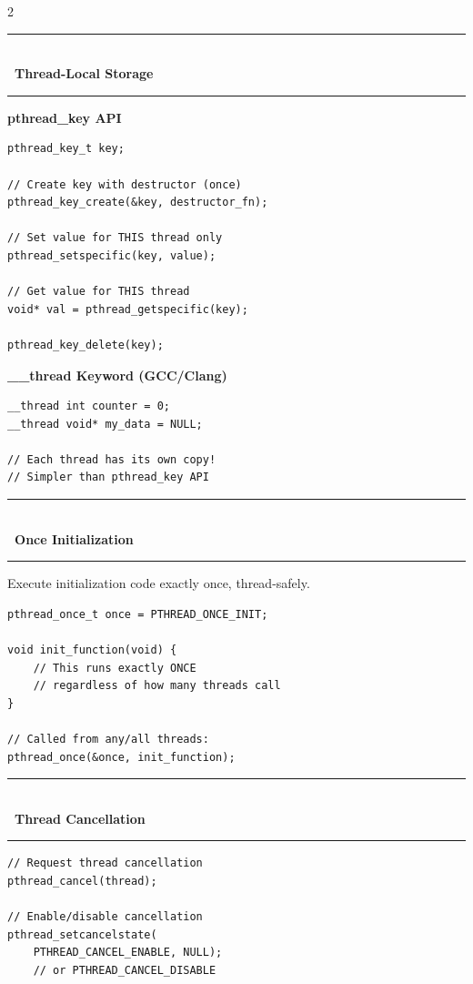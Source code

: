\documentclass[11pt,a4paper]{article}
\newcommand{\styledSection}[2]{%
    \vspace{8pt}%
    \noindent\textcolor{primaryblue}{\rule{\linewidth}{1.5pt}}\\[-8pt]
    {\fontsize{14pt}{16pt}\selectfont\bfseries\color{primaryblue}#1\ #2}\\[-4pt]
    \textcolor{primaryblue!50}{\rule{\linewidth}{0.8pt}}%
    \vspace{4pt}%
}
\newcommand{\styledSubSection}[1]{%
    \vspace{4pt}%
    {\fontsize{11pt}{13pt}\selectfont\bfseries\color{secondaryblue}#1}%
    \vspace{2pt}%
}
\begin{document}
\begin{multicols}{2}
\styledSection{\faKey}{Thread-Local Storage}

\styledSubSection{pthread\_key API}
\begin{lstlisting}
pthread_key_t key;

// Create key with destructor (once)
pthread_key_create(&key, destructor_fn);

// Set value for THIS thread only
pthread_setspecific(key, value);

// Get value for THIS thread
void* val = pthread_getspecific(key);

pthread_key_delete(key);
\end{lstlisting}

\styledSubSection{\_\_thread Keyword (GCC/Clang)}
\begin{lstlisting}
__thread int counter = 0;
__thread void* my_data = NULL;

// Each thread has its own copy!
// Simpler than pthread_key API
\end{lstlisting}

\styledSection{\faCheckDouble}{Once Initialization}

\textcolor{textmuted}{\footnotesize Execute initialization code exactly once, thread-safely.}

\begin{lstlisting}
pthread_once_t once = PTHREAD_ONCE_INIT;

void init_function(void) {
    // This runs exactly ONCE
    // regardless of how many threads call
}

// Called from any/all threads:
pthread_once(&once, init_function);
\end{lstlisting}

\styledSection{\faBan}{Thread Cancellation}

\begin{lstlisting}
// Request thread cancellation
pthread_cancel(thread);

// Enable/disable cancellation
pthread_setcancelstate(
    PTHREAD_CANCEL_ENABLE, NULL);
    // or PTHREAD_CANCEL_DISABLE


\end{lstlisting}
\end{multicols}
\end{document}
